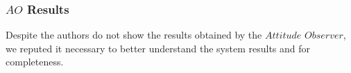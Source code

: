 \documentclass{beamer}
\begin{document}
		
		
			
			

	\begin{frame}
		\frametitle{$AO$ Results}
		Despite the authors do not show the results obtained by the $Attitude$ $Observer$, we reputed it necessary to better understand the system results and for completeness.
	\end{frame}
\end{document}
